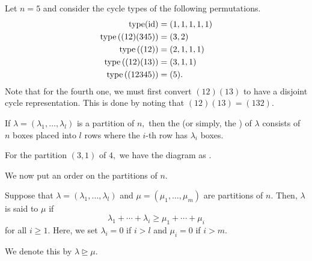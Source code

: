\begin{ex}
	Let $n = 5$ and consider the cycle types of the following permutations.
	\begin{align*} 
		\operatorname{type}(\operatorname{id}) &= (1, 1, 1, 1, 1)\\
		\operatorname{type}\left((12)(345)\right) &= (3, 2)\\
		\operatorname{type}\left((12)\right) &= (2, 1, 1, 1)\\
		\operatorname{type}\left((12)(13)\right) &= (3, 1, 1)\\
		\operatorname{type}\left((12345)\right) &= (5).
	\end{align*}
	Note that for the fourth one, we must first convert $(12)(13)$ to have a disjoint cycle representation. This is done by noting that $(12)(13) = (132).$
\end{ex}

\begin{defn}%
	\label{defn:youngdiag}
	If $\lambda = (\lambda_1, \ldots, \lambda_l)$ is a partition of $n,$ then the  (or simply, the ) of $\lambda$ consists of $n$ boxes placed into $l$ rows where the $i$-th row has $\lambda_i$ boxes.
\end{defn}

\begin{ex}
	For the partition $(3, 1)$ of $4,$ we have the diagram as .
\end{ex}



We now put an order on the partitions of $n.$
\begin{defn}%
	\label{defn:domorder}
	Suppose that $\lambda = (\lambda_1, \ldots, \lambda_l)$ and $\mu = (\mu_1, \ldots, \mu_m)$ are partitions of $n.$ Then, $\lambda$ is said to  $\mu$ if
	\begin{equation*} 
		\lambda_1 + \cdots + \lambda_i \ge \mu_1 + \cdots + \mu_i
	\end{equation*}
	for all $i \ge 1.$ Here, we set $\lambda_i = 0$ if $i > l$ and $\mu_i = 0$ if $i > m.$

	We denote this by $\lambda \unrhd \mu.$
\end{defn}

